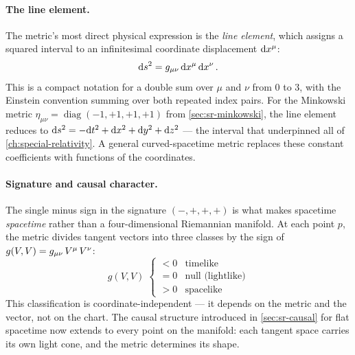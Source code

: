 \paragraph{The line element.}

The metric's most direct physical expression is the \emph{line element},
which assigns a squared interval to an infinitesimal coordinate displacement
$\mathrm{d} x^\mu$:
%
\begin{equation}
  \mathrm{d} s^2 = g_{\mu\nu}\,\mathrm{d} x^\mu\,\mathrm{d} x^\nu \,.
  \label{eq:line-element}
\end{equation}
%
This is a compact notation for a double sum over $\mu$ and $\nu$ from 0 to 3,
with the Einstein convention summing over both repeated index pairs.  For the
Minkowski metric $\eta_{\mu\nu} = \operatorname{diag}(-1,+1,+1,+1)$ from
\cref{sec:sr-minkowski}, the line element reduces to
$\mathrm{d} s^2 = -\mathrm{d} t^2 + \mathrm{d} x^2 + \mathrm{d} y^2 + \mathrm{d} z^2$ --- the interval that
underpinned all of \cref{ch:special-relativity}.  A general curved-spacetime
metric replaces these constant coefficients with functions of the coordinates.

\paragraph{Signature and causal character.}

The single minus sign in the signature $(-,+,+,+)$ is what makes spacetime
\emph{spacetime} rather than a four-dimensional Riemannian manifold.  At each
point $p$, the metric divides tangent vectors into three classes by the sign of
$g(V, V) = g_{\mu\nu}\, V^\mu\, V^\nu$:
%
\begin{equation}
  g(V, V) \;\begin{cases}
    < 0 & \text{timelike} \\
    = 0 & \text{null (lightlike)} \\
    > 0 & \text{spacelike}
  \end{cases}
  \label{eq:causal-character}
\end{equation}
%
This classification is coordinate-independent --- it depends on the metric and
the vector, not on the chart.  The causal structure introduced in
\cref{sec:sr-causal} for flat spacetime now extends to every point on the
manifold: each tangent space carries its own light cone, and the metric
determines its shape.

